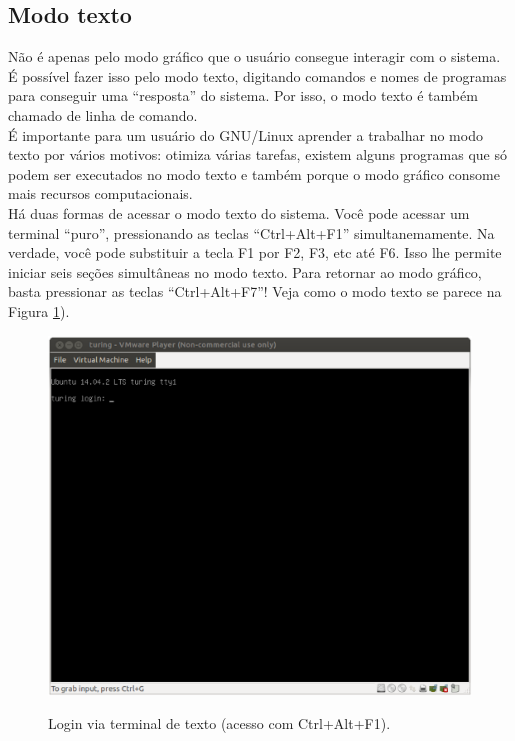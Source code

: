 \begin{refsection}
\section{Modo texto}\label{tut1:text_mode}
 Não é apenas pelo modo gráfico que o usuário consegue interagir com o sistema. É possível fazer isso pelo modo texto, digitando comandos e nomes de programas para conseguir uma ``resposta'' do sistema. Por isso, o modo texto é também chamado de linha de comando.\\
É importante para um usuário do GNU/Linux aprender a trabalhar no modo texto por vários motivos: otimiza várias tarefas, existem alguns programas que só podem ser executados no modo texto e também porque o modo gráfico consome mais recursos computacionais.\\
Há duas formas de acessar o modo texto do sistema. Você pode acessar um terminal ``puro'', pressionando as teclas ``Ctrl+Alt+F1'' simultanemamente. Na verdade, você pode substituir a tecla F1 por F2, F3, etc até F6. Isso lhe permite iniciar seis seções simultâneas no modo texto. Para retornar ao modo gráfico, basta pressionar as teclas ``Ctrl+Alt+F7''! Veja como o modo texto se parece na Figura \ref{tut1:fig:terminal0}).\\

  \begin{figure}[H]
      {\includegraphics[scale=0.35]{figures/tut1/terminal0.eps}}
      {\caption[\textit{Acesso ao terminal via Ctrl+Alt+F1}]{Login via terminal de texto (acesso com Ctrl+Alt+F1).}\label{tut1:fig:terminal0}}
  \end{figure}


\end{refsection}
